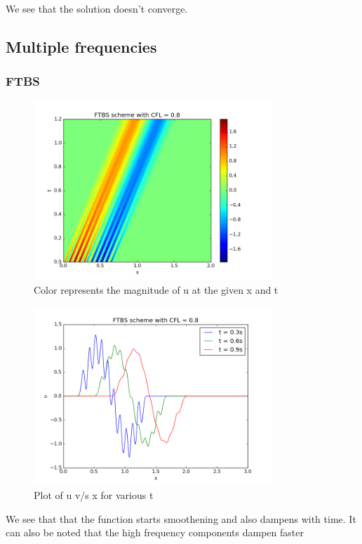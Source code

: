 \documentclass[11pt, a4paper]{article}
\begin{document}
We see that the solution doesn't converge.
\subsection{Multiple frequencies}
\subsubsection{FTBS}
\begin{figure}[H]
 \centering
 \includegraphics[width = 0.8\textwidth]{FTBS3_08.png}
 \caption{Color represents the magnitude of u at the given x and t}
\end{figure}

\begin{figure}[H]
 \centering
 \includegraphics[width = 0.8\textwidth]{FTBS3_08_1.png}
 \caption{Plot of u v/s x for various t}
\end{figure}

We see that that the function starts smoothening and also dampens with time. It can also be noted that the high frequency
components dampen faster
\end{document}
